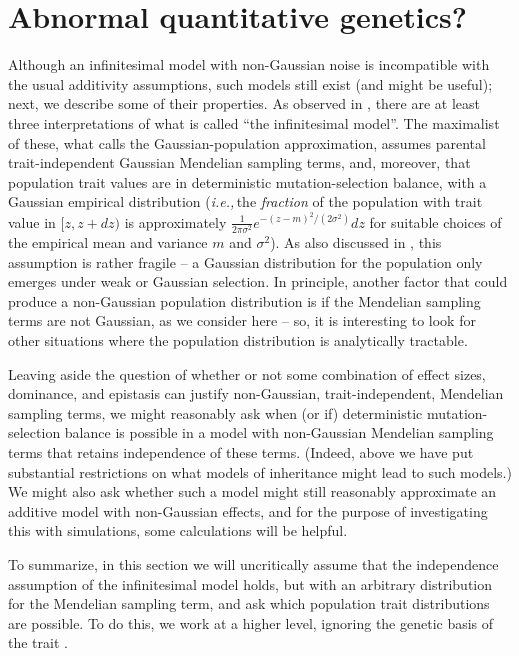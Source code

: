 \documentclass{article}
\newcommand{\ie}{\textit{i.e.,}\,}
\newcommand{\1}{\mathbbm{1}}
\theoremstyle{remark}
\theoremstyle{definition}
\begin{document}
\section{Abnormal quantitative genetics?}
    \label{sec:abnormal}

Although an infinitesimal model with non-Gaussian noise is incompatible with the usual additivity assumptions,
such models still exist (and might be useful);
next, we describe some of their properties.
As observed in \cite{turelli2017commentary},
there are at least three interpretations of what is called ``the infinitesimal model''. 
The maximalist of these, what \cite{turelli2017commentary} calls the Gaussian-population approximation,
assumes parental trait-independent Gaussian Mendelian sampling terms,
and, moreover, that  population trait values are in deterministic mutation-selection balance, with a Gaussian empirical distribution
(\ie the \emph{fraction} of the population with trait value in $[z,z+dz)$
is approximately $\frac{1}{2\pi\sigma^{2}} e^{-(z-m)^{2}/(2\sigma^{2})} dz$
for suitable choices of the empirical mean and variance $m$ and $\sigma^{2}$).
As also discussed in \citet{turelli2017commentary}, 
this assumption is rather fragile --
a Gaussian distribution for the population only emerges under weak or Gaussian selection.
In principle, another factor that could produce a non-Gaussian population distribution
is if the Mendelian sampling terms are not Gaussian, as we consider here --
so, it is interesting to look for other situations where the population distribution is analytically tractable.

Leaving aside 
the question of whether or not some combination of effect sizes, dominance, and epistasis can justify non-Gaussian, trait-independent,  Mendelian sampling terms, we might reasonably ask when (or if)
deterministic mutation-selection balance is possible in a model with non-Gaussian Mendelian sampling terms
that retains independence of these terms.
(Indeed, above we have put substantial restrictions on what models of inheritance
might lead to such models.)
We might also ask whether such a model
might still reasonably approximate an additive model with non-Gaussian effects,
and for the purpose of investigating this with simulations,
some calculations will be helpful.

To summarize, in this section we will uncritically assume that 
the independence assumption of the infinitesimal model holds,
but with an arbitrary distribution for the Mendelian sampling term,
and ask which population trait distributions are possible.
To do this, we work at a higher level,
ignoring the genetic basis of the trait
\citep[and certainly not using the specific set-up of][]{barton2017infinitesimal}.
\end{document}

